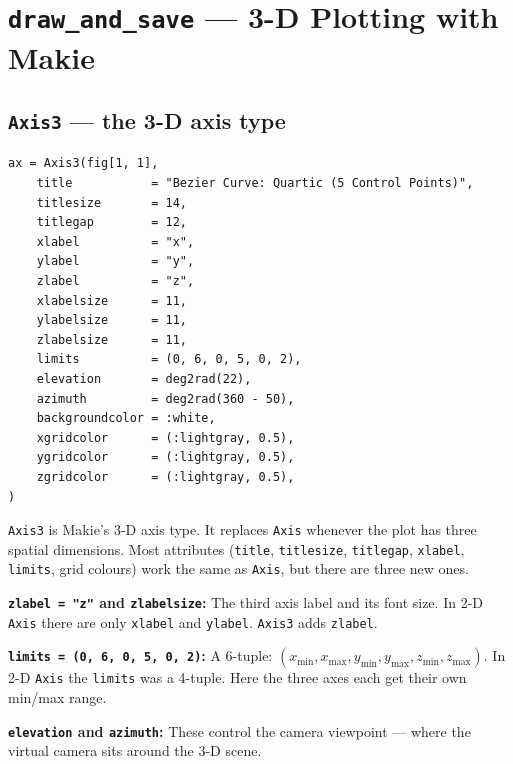 \documentclass[12pt, a4paper]{article}
\newcommand{\cd}[1]{\texttt{#1}}
\begin{document}
\section{\texttt{draw\_and\_save} --- 3-D Plotting with Makie}

\subsection{\texttt{Axis3} --- the 3-D axis type}
\label{sec:axis3}

\begin{verbatim}
ax = Axis3(fig[1, 1],
    title           = "Bezier Curve: Quartic (5 Control Points)",
    titlesize       = 14,
    titlegap        = 12,
    xlabel          = "x",
    ylabel          = "y",
    zlabel          = "z",
    xlabelsize      = 11,
    ylabelsize      = 11,
    zlabelsize      = 11,
    limits          = (0, 6, 0, 5, 0, 2),
    elevation       = deg2rad(22),
    azimuth         = deg2rad(360 - 50),
    backgroundcolor = :white,
    xgridcolor      = (:lightgray, 0.5),
    ygridcolor      = (:lightgray, 0.5),
    zgridcolor      = (:lightgray, 0.5),
)
\end{verbatim}

\cd{Axis3} is Makie's 3-D axis type.
It replaces \cd{Axis} whenever the plot has three spatial
dimensions.
Most attributes (\cd{title}, \cd{titlesize}, \cd{titlegap},
\cd{xlabel}, \cd{limits}, grid colours) work the same as
\cd{Axis}, but there are three new ones.

\textbf{\cd{zlabel = "z"} and \cd{zlabelsize}:}
The third axis label and its font size.
In 2-D \cd{Axis} there are only \cd{xlabel} and \cd{ylabel}.
\cd{Axis3} adds \cd{zlabel}.

\textbf{\cd{limits = (0, 6, 0, 5, 0, 2)}:}
A 6-tuple: $(x_{\min}, x_{\max}, y_{\min}, y_{\max}, z_{\min}, z_{\max})$.
In 2-D \cd{Axis} the \cd{limits} was a 4-tuple.
Here the three axes each get their own min/max range.

\textbf{\cd{elevation} and \cd{azimuth}:}
These control the camera viewpoint ---
where the virtual camera sits around the 3-D scene.
\end{document}
